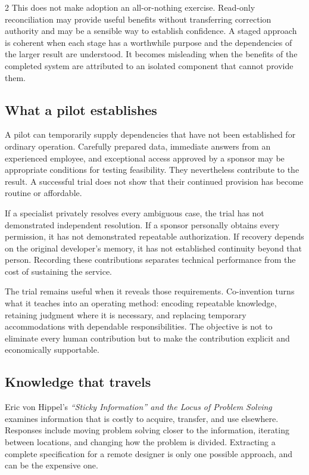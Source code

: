 \begin{multicols}{2}
This does not make adoption an all-or-nothing exercise. Read-only
reconciliation may provide useful benefits without transferring
correction authority and may be a sensible way to establish confidence.
A staged approach is coherent when each stage has a worthwhile purpose
and the dependencies of the larger result are understood. It becomes
misleading when the benefits of the completed system are attributed to
an isolated component that cannot provide them.

\subsection{What a pilot establishes}\label{what-a-pilot-establishes}

A pilot can temporarily supply dependencies that have not been
established for ordinary operation. Carefully prepared data, immediate
answers from an experienced employee, and exceptional access approved by
a sponsor may be appropriate conditions for testing feasibility. They
nevertheless contribute to the result. A successful trial does not show
that their continued provision has become routine or affordable.

If a specialist privately resolves every ambiguous case, the trial has
not demonstrated independent resolution. If a sponsor personally obtains
every permission, it has not demonstrated repeatable authorization. If
recovery depends on the original developer's memory, it has not
established continuity beyond that person. Recording these contributions
separates technical performance from the cost of sustaining the service.

The trial remains useful when it reveals those requirements.
Co-invention turns what it teaches into an operating method: encoding
repeatable knowledge, retaining judgment where it is necessary, and
replacing temporary accommodations with dependable responsibilities. The
objective is not to eliminate every human contribution but to make the
contribution explicit and economically supportable.

\subsection{Knowledge that travels}\label{knowledge-that-travels}

Eric von Hippel's \emph{``Sticky Information'' and the Locus of Problem
Solving} \citep{vonhippel1994sticky} examines information that is costly
to acquire, transfer, and use elsewhere. Responses include moving
problem solving closer to the information, iterating between locations,
and changing how the problem is divided. Extracting a complete
specification for a remote designer is only one possible approach, and
can be the expensive one.


\end{multicols}
